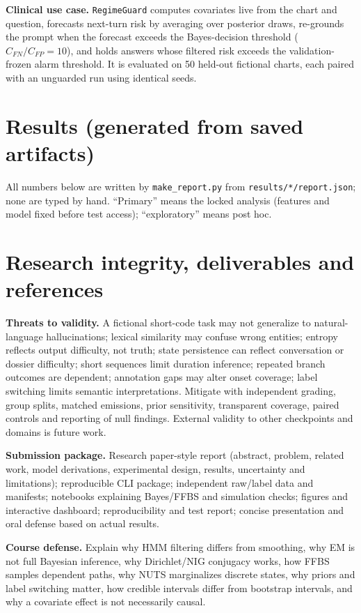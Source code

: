 \documentclass[11pt,letterpaper]{article}
\newcommand{\sectionpage}[1]{\clearpage\section{#1}}
\begin{document}
\textbf{Clinical use case.} \texttt{RegimeGuard} computes covariates live from the chart and question, forecasts next-turn risk by averaging over posterior draws, re-grounds the prompt when the forecast exceeds the Bayes-decision threshold ($C_{FN}/C_{FP}=10$), and holds answers whose filtered risk exceeds the validation-frozen alarm threshold. It is evaluated on 50 held-out fictional charts, each paired with an unguarded run using identical seeds.

\sectionpage{Results (generated from saved artifacts)}
\label{sec:results}
All numbers below are written by \texttt{make\_report.py} from \texttt{results/*/report.json}; none are typed by hand. ``Primary'' means the locked analysis (features and model fixed before test access); ``exploratory'' means post hoc.


\sectionpage{Research integrity, deliverables and references}
\textbf{Threats to validity.} A fictional short-code task may not generalize to natural-language hallucinations; lexical similarity may confuse wrong entities; entropy reflects output difficulty, not truth; state persistence can reflect conversation or dossier difficulty; short sequences limit duration inference; repeated branch outcomes are dependent; annotation gaps may alter onset coverage; label switching limits semantic interpretations. Mitigate with independent grading, group splits, matched emissions, prior sensitivity, transparent coverage, paired controls and reporting of null findings. External validity to other checkpoints and domains is future work.

\textbf{Submission package.} Research paper-style report (abstract, problem, related work, model derivations, experimental design, results, uncertainty and limitations); reproducible CLI package; independent raw/label data and manifests; notebooks explaining Bayes/FFBS and simulation checks; figures and interactive dashboard; reproducibility and test report; concise presentation and oral defense based on actual results.

\textbf{Course defense.} Explain why HMM filtering differs from smoothing, why EM is not full Bayesian inference, why Dirichlet/NIG conjugacy works, how FFBS samples dependent paths, why NUTS marginalizes discrete states, why priors and label switching matter, how credible intervals differ from bootstrap intervals, and why a covariate effect is not necessarily causal.
\end{document}
